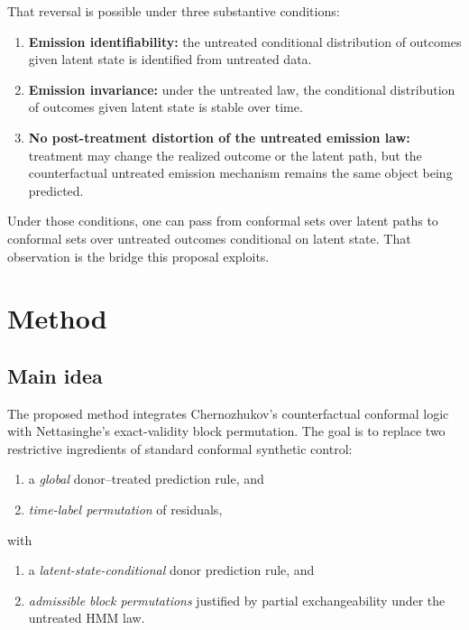\documentclass[11pt]{article}
\begin{document}
That reversal is possible under three substantive conditions:

\begin{enumerate}[label=(\roman*)]
    \item \textbf{Emission identifiability:} the untreated conditional distribution of outcomes given latent state is identified from untreated data.
    \item \textbf{Emission invariance:} under the untreated law, the conditional distribution of outcomes given latent state is stable over time.
    \item \textbf{No post-treatment distortion of the untreated emission law:} treatment may change the realized outcome or the latent path, but the counterfactual untreated emission mechanism remains the same object being predicted.
\end{enumerate}

Under those conditions, one can pass from conformal sets over latent paths to conformal sets over untreated outcomes conditional on latent state. That observation is the bridge this proposal exploits.

\section{Method}

\subsection{Main idea}

The proposed method integrates Chernozhukov's counterfactual conformal logic with Nettasinghe's exact-validity block permutation. The goal is to replace two restrictive ingredients of standard conformal synthetic control:

\begin{enumerate}[label=\arabic*.]
    \item a \emph{global} donor--treated prediction rule, and
    \item \emph{time-label permutation} of residuals,
\end{enumerate}

with

\begin{enumerate}[label=\arabic*.]
    \item a \emph{latent-state-conditional} donor prediction rule, and
    \item \emph{admissible block permutations} justified by partial exchangeability under the untreated HMM law.
\end{enumerate}
\end{document}

